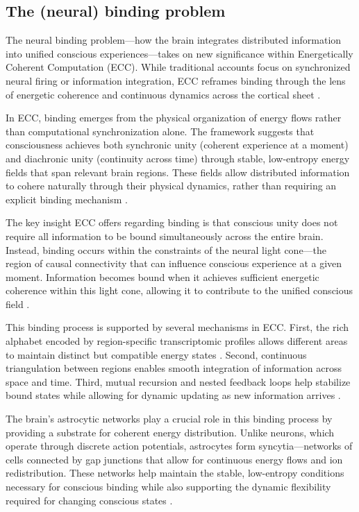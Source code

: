 \subsection{The (neural) binding problem}

The neural binding problem—how the brain integrates distributed information into unified conscious experiences—takes on new significance within Energetically Coherent Computation (ECC). While traditional accounts focus on synchronized neural firing or information integration, ECC reframes binding through the lens of energetic coherence and continuous dynamics across the cortical sheet \cite{hardcastle1999binding}.

In ECC, binding emerges from the physical organization of energy flows rather than computational synchronization alone. The framework suggests that consciousness achieves both synchronic unity (coherent experience at a moment) and diachronic unity (continuity across time) through stable, low-entropy energy fields that span relevant brain regions. These fields allow distributed information to cohere naturally through their physical dynamics, rather than requiring an explicit binding mechanism \cite{vondermalsburg1999binding}.

The key insight ECC offers regarding binding is that conscious unity does not require all information to be bound simultaneously across the entire brain. Instead, binding occurs within the constraints of the neural light cone—the region of causal connectivity that can influence conscious experience at a given moment. Information becomes bound when it achieves sufficient energetic coherence within this light cone, allowing it to contribute to the unified conscious field \cite{singer1999neuronal}.

This binding process is supported by several mechanisms in ECC. First, the rich alphabet encoded by region-specific transcriptomic profiles allows different areas to maintain distinct but compatible energy states \cite{kumar2010spiking}. Second, continuous triangulation between regions enables smooth integration of information across space and time. Third, mutual recursion and nested feedback loops help stabilize bound states while allowing for dynamic updating as new information arrives \cite{buzsaki2004neuronal}.

The brain's astrocytic networks play a crucial role in this binding process by providing a substrate for coherent energy distribution. Unlike neurons, which operate through discrete action potentials, astrocytes form syncytia—networks of cells connected by gap junctions that allow for continuous energy flows and ion redistribution. These networks help maintain the stable, low-entropy conditions necessary for conscious binding while also supporting the dynamic flexibility required for changing conscious states \cite{womelsdorf2007modulation}.

